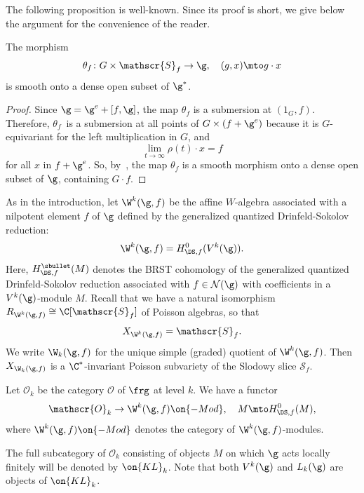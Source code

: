 The following proposition is well-known.
Since its proof is short, we give below
the argument for the convenience of the reader.

\begin{prop}
\label{pro:Slodowy}
The morphism
\[
\theta_f \colon G \times \mathscr{S}_f \to \g,
\quad (g,x) \mto g\cdot x
\]
is smooth onto a dense open subset of $\g^*$.
\end{prop}
\begin{proof}
Since $\g =\g^{e}+[f,\g]$, the map $\theta_f$ is a submersion at
$(1_{G},f)$. Therefore, $\theta _{f}$~is a submersion at all points of
$G\times (f +\g^{e})$ because it is $G$-equivariant for the left
multiplication in $G$, and
\[
\lim _{t \to \infty } \rho(t)\cdot x = f
\]
for all $x$ in $f+\g^{e}$. So, by~\cite[Ch.\,III, Prop.\,10.4]{Hartshorne},
the map $\theta _{f}$ is a smooth morphism onto a dense open subset of
$\g$, containing $G\cdot f$.
\end{proof}

As in the introduction, let $\W^k(\g,f)$ be the {affine $W$-algebra} associated with
a nilpotent element $f$ of $\g$
defined by the generalized quantized Drinfeld-Sokolov reduction:
\[
\W^k(\g,f)=H^{0}_{\DS,f}(V^k(\g)).
\]
Here, $H^{\sbullet}_{\DS,f}(M)$ denotes the BRST
cohomology of the generalized quantized Drinfeld-Sokolov reduction
associated with $f \in \mathcal{N}(\g)$ with coefficients in
a $V^k(\g)$-module $M$.
Recall that we have \cite{DSK06,Ara09b} a natural isomorphism
$R_{\W^k(\g,f)}\cong \C[\mathscr{S}_{f}]$ of Poisson algebras, so that
\begin{equation*}
X_{\W^k(\g,f)}= \mathscr{S}_{f}.
\end{equation*}
We write $\W_k(\g,f)$ for the unique simple (graded) quotient of
$\W^k(\g,f)$. Then $X_{\W_k(\g,f)}$
is a $\C^*$-invariant Poisson
subvariety of the Slodowy slice $\mathscr{S}_f$.

Let $\mathscr{O}_k$ be the category $\mathscr{O}$ of
$\frg$ at level $k$.
We have a functor
\begin{equation*}
\mathscr{O}_k\to\W^k(\g,f)\on{-Mod},\quad M\mto
H^0_{\DS,f}(M),
\end{equation*}
where
$\W^k(\g,f)\on{-Mod}$ denotes the category
of $\W^k(\g,f)$-modules.

The full subcategory of $\mathscr{O}_k$ consisting of
objects $M$ on which $\g$ acts locally finitely will be denoted by $\on{KL}_k$.
Note that both $V^k(\g)$ and $L_k(\g)$ are objects of $\on{KL}_k$.

